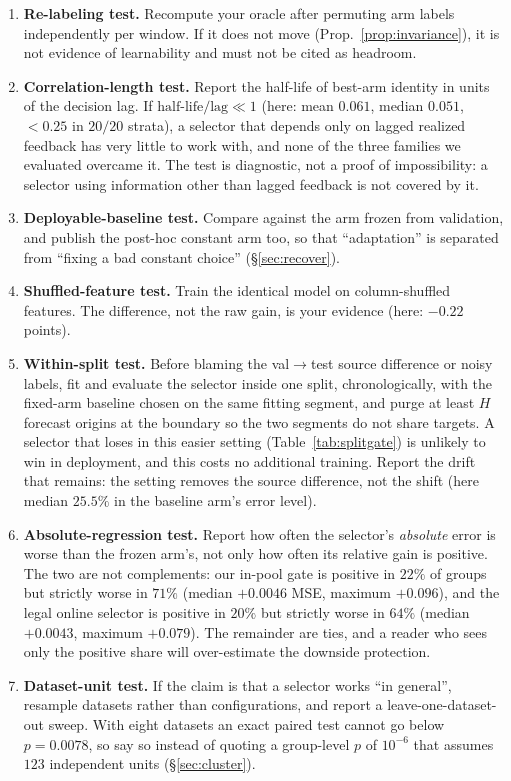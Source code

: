 \documentclass[a4paper,fleqn]{cas-sc}
\begin{document}
\begin{enumerate}\itemsep2pt
\item \textbf{Re-labeling test.} Recompute your oracle after permuting arm
labels independently per window. If it does not move
(Prop.~\ref{prop:invariance}), it is not evidence of learnability and must not
be cited as headroom.
\item \textbf{Correlation-length test.} Report the half-life of best-arm
identity in units of the decision lag. If $\text{half-life}/\text{lag} \ll 1$
(here: mean $0.061$, median $0.051$, $<0.25$ in $20/20$ strata), a selector that
depends only on lagged realized feedback has very little to work with, and none of
the three families we evaluated overcame it. The test is diagnostic, not a
proof of impossibility: a selector using information other than lagged feedback is
not covered by it.
\item \textbf{Deployable-baseline test.} Compare against the arm frozen from
validation, and publish the post-hoc constant arm too, so that
``adaptation'' is separated from ``fixing a bad constant choice''
(\S\ref{sec:recover}).
\item \textbf{Shuffled-feature test.} Train the identical model on
column-shuffled features. The difference, not the raw gain, is your evidence
(here: $-0.22$ points).
\item \textbf{Within-split test.} Before blaming the val$\to$test source
difference or noisy
labels, fit and evaluate the selector inside one split, chronologically, with
the fixed-arm baseline chosen on the same fitting segment, and purge at least $H$
forecast origins at the boundary so the two segments do not share targets. A
selector that loses in this easier setting
(Table~\ref{tab:splitgate}) is unlikely to win in deployment, and this costs no
additional training. Report the drift that remains: the setting removes the source
difference, not the shift (here median $25.5\%$ in the baseline arm's error level).
\item \textbf{Absolute-regression test.} Report how often the selector's
\emph{absolute} error is worse than the frozen arm's, not only how often its
relative gain is positive. The two are not complements: our in-pool gate is
positive in $22\%$ of groups but strictly worse in $71\%$ (median $+0.0046$ MSE,
maximum $+0.096$), and the legal online selector is positive in $20\%$ but
strictly worse in $64\%$ (median $+0.0043$, maximum $+0.079$). The remainder are
ties, and a reader who sees only the positive share will over-estimate the
downside protection.
\item \textbf{Dataset-unit test.} If the claim is that a selector works
``in general'', resample datasets rather than configurations, and report a
leave-one-dataset-out sweep. With eight datasets an exact paired test cannot go
below $p = 0.0078$, so say so instead of quoting a group-level $p$ of $10^{-6}$
that assumes $123$ independent units (\S\ref{sec:cluster}).

\end{enumerate}
\end{document}
